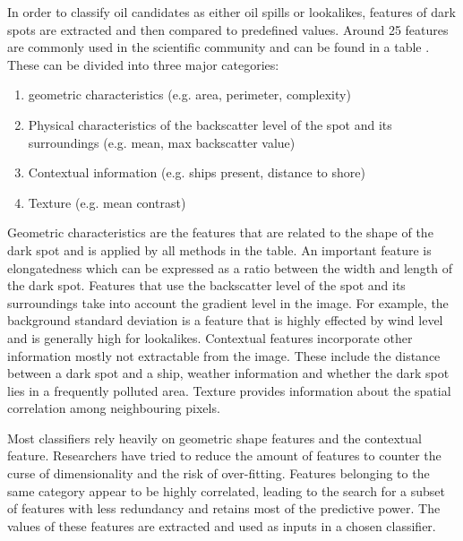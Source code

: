In order to classify oil candidates as either oil spills or lookalikes, features of dark spots are extracted and then compared to predefined values. Around 25 features are commonly used in the scientific community and can be found in a table \cite{Topouzelis200930}. These can be divided into three major categories\cite{Brekke200595}:
\begin{enumerate}
\item geometric characteristics (e.g. area, perimeter, complexity)
\item Physical characteristics of the backscatter level of the spot and its surroundings (e.g. mean, max backscatter value)
\item Contextual information (e.g. ships present, distance to shore)
\item Texture (e.g. mean contrast)
\end{enumerate}

Geometric characteristics are the features that are related to the shape of the dark spot and is applied by all methods in the table\cite{Topouzelis200930}. An important feature is elongatedness which can be expressed as a ratio between the width and length of the dark spot\cite{Gasull20071}. Features that use the backscatter level of the spot and its surroundings take into account the gradient level in the image. For example, the background standard deviation is a feature that is highly effected by wind level and is generally high for lookalikes. Contextual features incorporate other information mostly not extractable from the image. These include the distance between a dark spot and a ship, weather information and whether the dark spot lies in a frequently polluted area. Texture provides information about the spatial correlation among neighbouring pixels.

Most classifiers rely heavily on geometric shape features and the contextual feature.\cite{Xu201414} Researchers have tried to reduce the amount of features to counter the curse of dimensionality and the risk of over-fitting. Features belonging to the same category appear to be highly correlated\cite{Xu201414}, leading to the search for a subset of features with less redundancy and retains most of the predictive power\cite{Topouzelis200930}. The values of these features are extracted and used as inputs in a chosen classifier.
